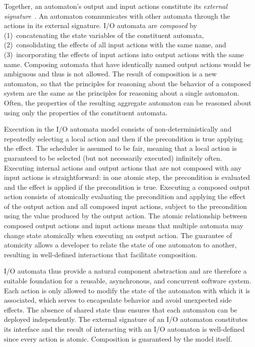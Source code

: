 Together, an automaton's output and input actions constitute its \emph{external signature}~\cite{lynch1996distributed}.
An automaton communicates with other automata through the actions in its external signature.
I/O automata are \emph{composed} by (1)~concatenating the state variables of the constituent automata, (2)~consolidating the effects of all input actions with the same name, and (3)~incorporating the effects of input actions into output actions with the same name.
Composing automata that have identically named output actions would be ambiguous and thus is not allowed.
The result of composition is a new automaton, so that the principles for reasoning about the behavior of a composed system are the same as the principles for reasoning about a single automaton.
Often, the properties of the resulting aggregate automaton can be reasoned about using only the properties of the constituent automata.

Execution in the I/O automata model consists of non-deterministically and repeatedly selecting a local action and then if the precondition is true applying the effect.
The scheduler is assumed to be fair, meaning that a local action is guaranteed to be selected (but not necessarily executed) infinitely often.
Executing internal actions and output actions that are not composed with any input actions is straightforward: in one atomic step, the precondition is evaluated and the effect is applied if the precondition is true.
Executing a composed output action consists of atomically evaluating the precondition and applying the effect of the output action and all composed input actions,  subject to the precondition using the value produced by the output action.
The atomic relationship between composed output actions and input actions means that multiple automata may change state atomically when executing an output action.
The guarantee of atomicity allows a developer to relate the state of one automaton to another, resulting in well-defined interactions that facilitate composition.

I/O automata thus provide a natural component abstraction and are therefore a suitable foundation for a reusable, asynchronous, and concurrent software system.
Each action is only allowed to modify the state of the automaton with which it is associated, which serves to encapsulate behavior and avoid unexpected side effects.
The absence of shared state thus ensures that each automaton can be deployed independently.
The external signature of an I/O automaton constitutes its interface and the result of interacting with an I/O automaton is well-defined since every action is atomic.
Composition is guaranteed by the model itself.

